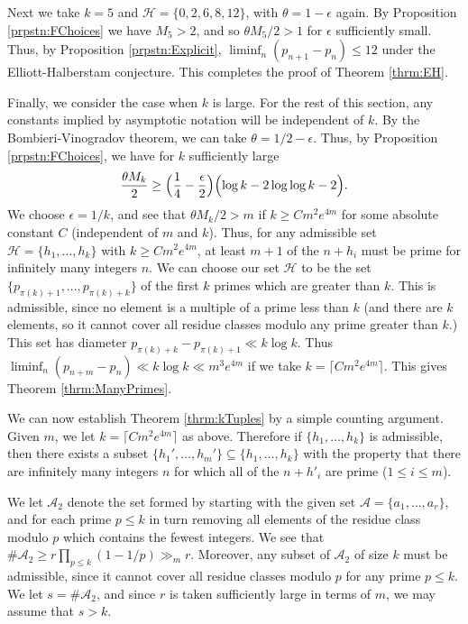 \documentclass[12pt,a4paper]{amsart}
\theoremstyle{plain}
\numberwithin{sblmm}{thrm}
\numberwithin{equation}{section}
\begin{document}
Next we take $k=5$ and $\mathcal{H}=\{0,2,6,8,12\}$, with $\theta=1-\epsilon$ again. By Proposition \ref{prpstn:FChoices} we have $M_5>2$, and so $\theta M_5/2>1$ for $\epsilon$ sufficiently small. Thus, by Proposition \ref{prpstn:Explicit}, $\liminf_n(p_{n+1}-p_n)\le 12$ under the Elliott-Halberstam conjecture. This completes the proof of Theorem \ref{thrm:EH}.

Finally, we consider the case when $k$ is large. For the rest of this section, any constants implied by asymptotic notation will be independent of $k$. By the Bombieri-Vinogradov theorem, we can take $\theta=1/2-\epsilon$. Thus, by Proposition \ref{prpstn:FChoices}, we have for $k$ sufficiently large
\begin{equation}
\frac{\theta M_k}{2}\ge \Bigl(\frac{1}{4}-\frac{\epsilon}{2}\Bigr)\Bigl(\log{k}-2\log\log{k}-2\Bigr).
\end{equation}
We choose $\epsilon=1/k$, and see that $\theta M_k/2> m$ if $k\ge C m^2 e^{4m}$ for some absolute constant $C$ (independent of $m$ and $k$). Thus, for any admissible set $\mathcal{H}=\{h_1,\dotsc,h_k\}$ with $k\ge C m^2 e^{4m}$, at least $m+1$ of the $n+h_i$ must be prime for infinitely many integers $n$. We can choose our set $\mathcal{H}$ to be the set $\{p_{\pi(k)+1},\dotsc,p_{\pi(k)+k}\}$ of the first $k$ primes which are greater than $k$. This is admissible, since no element is a multiple of a prime less than $k$ (and there are $k$ elements, so it cannot cover all residue classes modulo any prime greater than $k$.) This set has diameter $p_{\pi(k)+k}-p_{\pi(k)+1}\ll k\log{k}$. Thus $\liminf_{n}(p_{n+m}-p_n)\ll k\log{k}\ll m^3 e^{4m}$ if we take $k=\lceil Cm^2 e^{4m}\rceil $. This gives Theorem \ref{thrm:ManyPrimes}.

We can now establish Theorem \ref{thrm:kTuples} by a simple counting argument. Given $m$, we let $k=\lceil Cm^2e^{4m}\rceil$ as above. Therefore if $\{h_1,\dotsc,h_k\}$ is admissible, then there exists a subset $\{h_1',\dotsc,h_m'\}\subseteq\{h_1,\dotsc,h_k\}$ with the property that there are infinitely many integers $n$ for which all of the $n+h'_i$ are prime ($1\le i\le m$).

We let $\mathcal{A}_2$ denote the set formed by starting with the given set $\mathcal{A}=\{a_1,\dotsc,a_r\}$, and  for each prime $p\le k$ in turn removing all elements of the residue class modulo $p$ which contains the fewest integers. We see that $\#\mathcal{A}_2\ge r\prod_{p\le k}(1-1/p)\gg_m r$. Moreover, any subset of $\mathcal{A}_2$ of size $k$ must be admissible, since it cannot cover all residue classes modulo $p$ for any prime $p\le k$. We let $s=\#\mathcal{A}_2$, and since $r$ is taken sufficiently large in terms of $m$, we may assume that $s>k$.
\end{document}
